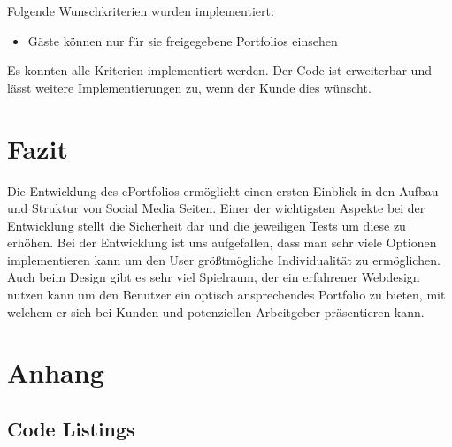 \documentclass[10.5pt]{scrarticle}
\begin{document}
Folgende Wunschkriterien wurden implementiert:

\begin{itemize}
	\item Gäste können nur für sie freigegebene Portfolios einsehen
\end{itemize}

Es konnten alle Kriterien implementiert werden. Der Code ist erweiterbar und lässt weitere Implementierungen zu, wenn der Kunde dies wünscht.

\section{Fazit}

Die Entwicklung des ePortfolios ermöglicht einen ersten Einblick in den Aufbau und Struktur von Social Media Seiten. Einer der wichtigsten Aspekte bei der Entwicklung stellt die Sicherheit dar und die jeweiligen Tests um diese zu erhöhen. Bei der Entwicklung ist uns aufgefallen, dass man sehr viele Optionen implementieren kann um den User grö{\ss}tmögliche Individualität zu ermöglichen. Auch beim Design gibt es sehr viel Spielraum, der ein erfahrener Webdesign nutzen kann um den Benutzer ein optisch ansprechendes Portfolio zu bieten, mit welchem er sich bei Kunden und potenziellen Arbeitgeber präsentieren kann.

\newpage
\section{Anhang}
\subsection{Code Listings}

\lstset{firstnumber=1, basicstyle=\footnotesize}
\end{document}
